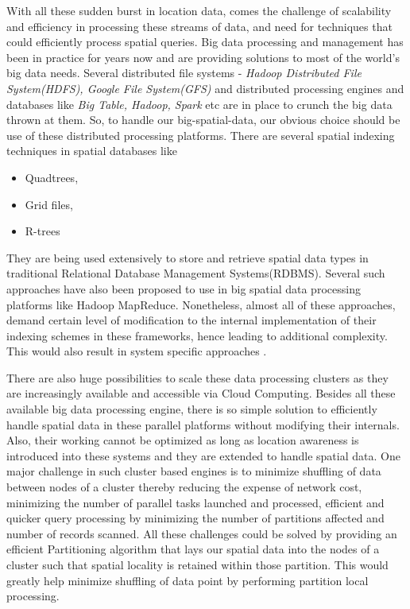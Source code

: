\documentclass[article,type=msc,colorback,12pt,accentcolor=tud1d]{tudthesis}
\begin{document}
		With all these sudden burst in location data, comes the challenge of scalability and efficiency in processing these streams of data, and need for techniques that could efficiently process spatial queries.  Big data processing and management has been in practice for years now and are providing solutions to most of the world's big data needs. Several distributed file systems -\textit{ Hadoop Distributed File System(HDFS), Google File System(GFS)} and distributed processing engines and databases like \textit{Big Table, Hadoop, Spark} etc are in place to crunch the big data thrown at them. So, to handle our big-spatial-data, our obvious choice should be use of these distributed processing platforms. There are several spatial indexing techniques in spatial databases like \begin{itemize}
			\item Quadtrees, 
			\item Grid files, 
			\item R-trees
		\end{itemize}They are being used extensively to store and retrieve spatial data types in traditional Relational Database Management Systems(RDBMS). Several such approaches have also been proposed to use in big spatial data processing platforms like Hadoop MapReduce. Nonetheless, almost all of these approaches, demand certain level of modification to the internal implementation of their indexing schemes in these frameworks, hence leading to additional complexity. This would also result in  system specific approaches \cite{Lee:2014:ESQ:2666310.2666481} \cite{6691586}. 
		
		\clearpage
		There are also huge possibilities to scale these data processing clusters as they are increasingly available and accessible via Cloud Computing. Besides all these available big data processing engine, there is so simple solution to efficiently handle spatial data in these parallel platforms without modifying their internals. Also, their working cannot be optimized as long as location awareness is introduced into these systems and they are extended to handle spatial data. One major challenge in such cluster based engines is to minimize shuffling of data between nodes of a cluster thereby reducing the expense of network cost, minimizing the number of parallel tasks launched and processed, efficient and quicker query processing by  minimizing the number of partitions affected and number of records scanned. All these challenges could be solved by providing an efficient Partitioning algorithm that lays our spatial data into the nodes of a cluster such that spatial locality is retained within those partition. This would greatly help minimize shuffling of data point by performing partition local processing. 
		
\end{document}
